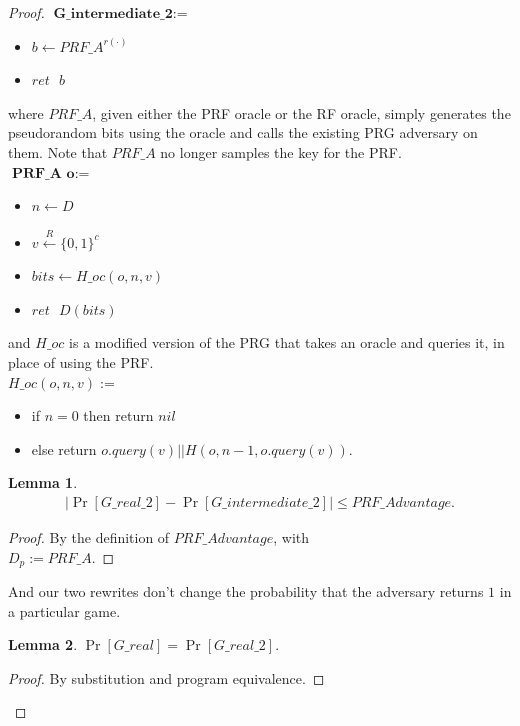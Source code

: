 \documentclass[12pt,lot, lof]{puthesis}
\newenvironment{game}
{ \begin{itemize}[noitemsep,nolistsep] 
}
{ \end{itemize}                  }
\newcommand{\s} {\textrm{ }}
\newcommand{\bt}{\{0,1\}}
\newtheorem{lem}{Lemma}[thm]
\begin{document}
{\begin{proof}
$\textbf{G\_intermediate\_2} := $
\begin{game}
\item[] $b \leftarrow PRF\_A^{r(\cdot)}$ 
\item[] $ret \s b$ \\
\end{game}

where $PRF\_A$, given either the PRF oracle or the RF oracle, simply generates the pseudorandom bits using the oracle and calls the existing PRG adversary on them. Note that $PRF\_A$ no longer samples the key for the PRF. \\

$\textbf{PRF\_A o} := $
\begin{game}
\item[] $n \leftarrow D$
\item[] $v \xleftarrow{R} \bt^c$
\item[] $bits \leftarrow H\_oc(o,n, v)$ 
\item[] $ret \s D(bits)$ \\
\end{game}

and $H\_oc$ is a modified version of the PRG that takes an oracle and queries it, in place of using the PRF.\\

$H\_{oc}(o, n, v) :=$
\begin{game}
\item[] if $n = 0$ then return $nil$
\item[] else return $o.query(v) || H(o, n-1, o.query(v)).$
\end{game}

\begin{lem} \begin{gather*}|\Pr[G\_real\_2] - \Pr[G\_intermediate\_2]| \leq PRF\_Advantage.\end{gather*} \end{lem}
\begin{proof} By the definition of $PRF\_Advantage$, with \\ $D_p := PRF\_A$. \end{proof}

And our two rewrites don't change the probability that the adversary returns $1$ in a particular game.

\begin{lem} $\Pr[G\_real] = \Pr[G\_real\_2].$ \end{lem}
\begin{proof} By substitution and program equivalence. \end{proof}


\end{proof}}
\end{document}
